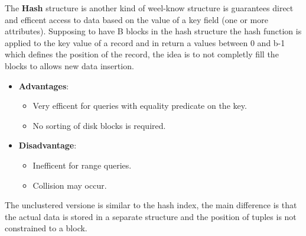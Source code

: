 \documentclass[12pt]{article}
\begin{document}
The \textbf{Hash} structure is another kind of weel-know structure is guarantees direct and efficent access to data based on the value of a key field (one or more attributes). Supposing to have B blocks in the hash structure the hash function is applied to the key value of a record and in return a values between 0 and b-1 which defines the position of the record, the idea is to not completly fill the blocks to allows new data insertion.
\begin{itemize}
  \item \textbf{Advantages}:
  \begin{itemize}
    \item Very efficent for queries with equality predicate on the key.
    \item No sorting of disk blocks is required.
  \end{itemize}
  \item \textbf{Disadvantage}:
  \begin{itemize}
    \item Inefficent for range queries.
    \item Collision may occur.
  \end{itemize}
\end{itemize}

The unclustered versione is similar to the hash index, the main difference is that the actual data is stored in a separate structure and the position of tuples is not constrained to a block.\\
\end{document}
